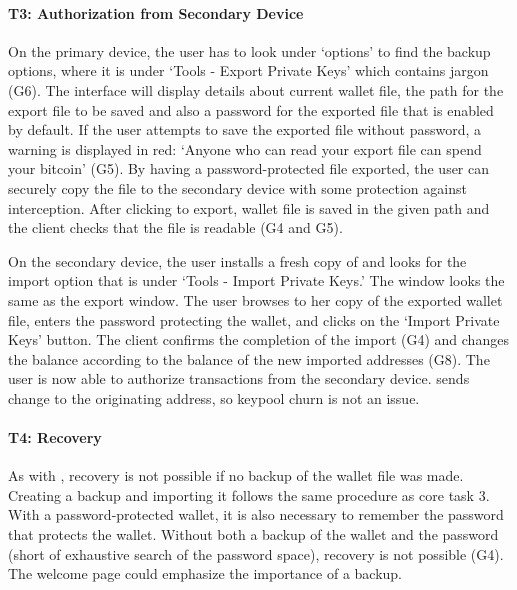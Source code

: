 
\paragraph{T3: Authorization from Secondary Device}

On the primary device, the user has to look under `options' to find the backup options, where it is under `Tools - Export Private Keys' which contains jargon (G6). The interface will display details about current wallet file, the path for the export file to be saved and also a password for the exported file that is enabled by default. If the user attempts to save the exported file without password, a warning is displayed in red: `Anyone who can read your export file can spend your bitcoin' (G5). By having a password-protected file exported, the user can securely copy the file to the secondary device with some protection against interception. After clicking to export, wallet file is saved in the given path and the client checks that the file is readable (G4 and G5). 

On the secondary device, the user installs a fresh copy of \multibit and looks for the import option that is under `Tools - Import Private Keys.' The window looks the same as the export window. The user browses to her copy of the exported wallet file, enters the password protecting the wallet, and clicks on the `Import Private Keys' button. The client confirms the completion of the import (G4) and changes the balance according to the balance of the new imported addresses (G8). The user is now able to authorize transactions from the secondary device. \multibit sends change to the originating address, so keypool churn is not an issue.


\paragraph{T4: Recovery}

As with \bitcoinclient, recovery is not possible if no backup of the wallet file was made. Creating a backup and importing it follows the same procedure as core task 3. With a password-protected wallet, it is also necessary to remember the password that protects the wallet. Without both a backup of the wallet and the password (short of exhaustive search of the password space), recovery is not possible (G4). The welcome page could emphasize the importance of a backup.  


